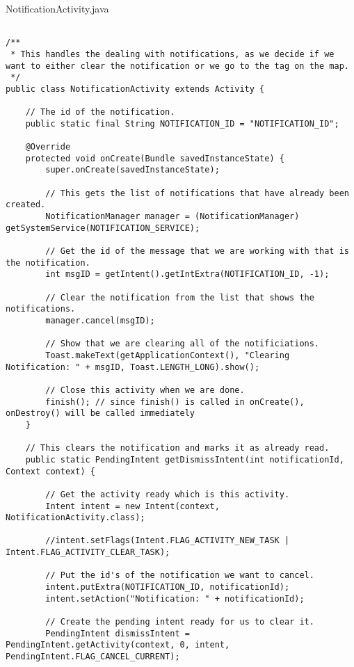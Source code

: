 NotificationActivity.java

\begin{lstlisting}

/**
 * This handles the dealing with notifications, as we decide if we want to either clear the notification or we go to the tag on the map.
 */
public class NotificationActivity extends Activity {

    // The id of the notification.
    public static final String NOTIFICATION_ID = "NOTIFICATION_ID";

    @Override
    protected void onCreate(Bundle savedInstanceState) {
        super.onCreate(savedInstanceState);

        // This gets the list of notifications that have already been created.
        NotificationManager manager = (NotificationManager) getSystemService(NOTIFICATION_SERVICE);

        // Get the id of the message that we are working with that is the notification.
        int msgID = getIntent().getIntExtra(NOTIFICATION_ID, -1);

        // Clear the notification from the list that shows the notifications.
        manager.cancel(msgID);

        // Show that we are clearing all of the notificiations.
        Toast.makeText(getApplicationContext(), "Clearing Notification: " + msgID, Toast.LENGTH_LONG).show();

        // Close this activity when we are done.
        finish(); // since finish() is called in onCreate(), onDestroy() will be called immediately
    }

    // This clears the notification and marks it as already read.
    public static PendingIntent getDismissIntent(int notificationId, Context context) {

        // Get the activity ready which is this activity.
        Intent intent = new Intent(context, NotificationActivity.class);

        //intent.setFlags(Intent.FLAG_ACTIVITY_NEW_TASK | Intent.FLAG_ACTIVITY_CLEAR_TASK);

        // Put the id's of the notification we want to cancel.
        intent.putExtra(NOTIFICATION_ID, notificationId);
        intent.setAction("Notification: " + notificationId);

        // Create the pending intent ready for us to clear it.
        PendingIntent dismissIntent = PendingIntent.getActivity(context, 0, intent, PendingIntent.FLAG_CANCEL_CURRENT);


\end{lstlisting}
